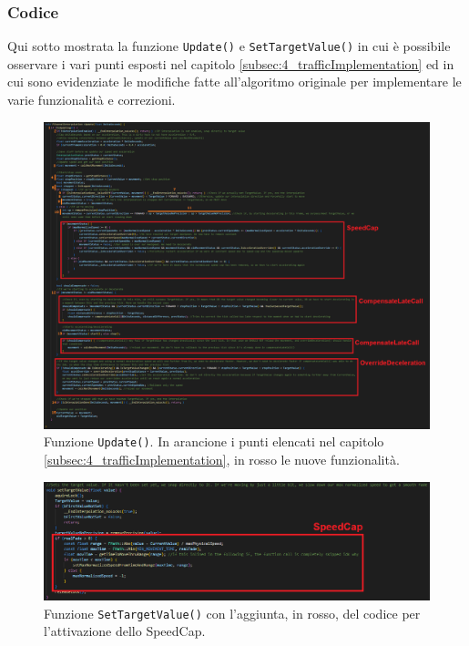 \documentclass[main.tex]{subfiles}
\begin{document}
\subsubsection{Codice}\label{subsubsec:4_2_Code}
Qui sotto mostrata la funzione \lstinline{Update()} e \lstinline{SetTargetValue()} in cui è possibile osservare i vari punti esposti nel capitolo \ref{subsec:4_trafficImplementation} ed in cui sono evidenziate le modifiche fatte all'algoritmo originale per implementare le varie funzionalità e correzioni.
\begin{figure}[H]
    \centering
    \includegraphics[width=1\linewidth]{img/interpolazione/Update.png}
    \caption{Funzione \lstinline{Update()}. In arancione i punti elencati nel capitolo \ref{subsec:4_trafficImplementation}, in rosso le nuove funzionalità.}
    \label{fig:4_Update}
\end{figure}
\begin{figure}[H]
    \centering
    \includegraphics[width=1\linewidth]{img/interpolazione/SetTargetValue.png}
    \caption{Funzione \lstinline{SetTargetValue()} con l'aggiunta, in rosso, del codice per l'attivazione dello SpeedCap.}
    \label{fig:4_SetTargetValue}
\end{figure}
\end{document}
